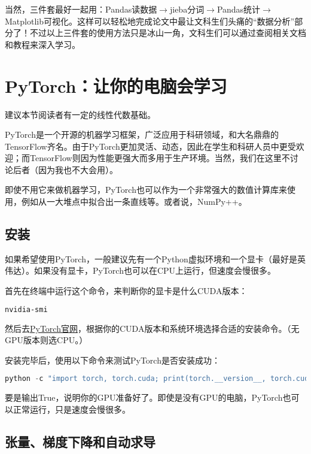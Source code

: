 \documentclass[../main.tex]{subfiles}
\begin{document}
当然，三件套最好一起用：Pandas读数据$\rightarrow$jieba分词$ \rightarrow $Pandas统计$
\rightarrow
$Matplotlib可视化。这样可以轻松地完成论文中最让文科生们头痛的“数据分析”部分了！不过以上三件套的使用方法只是冰山一角，文科生们可以通过查阅相关文档和教程来深入学习。

\section{PyTorch：让你的电脑会学习}
\begin{flushright}
  { \kaishu 建议本节阅读者有一定的线性代数基础。}
\end{flushright}

PyTorch是一个开源的机器学习框架，广泛应用于科研领域，和大名鼎鼎的TensorFlow齐名。由于PyTorch更加灵活、动态，因此在学生和科研人员中更受欢迎；而TensorFlow则因为性能更强大而多用于生产环境。当然，我们在这里不讨论后者（因为我也不大会用）。

即使不用它来做机器学习，PyTorch也可以作为一个非常强大的数值计算库来使用，例如从一大堆点中拟合出一条直线等。或者说，NumPy++。

\subsection{安装}

如果希望使用PyTorch，一般建议先有一个Python虚拟环境和一个显卡（最好是英伟达）。如果没有显卡，PyTorch也可以在CPU上运行，但速度会慢很多。

首先在终端中运行这个命令，来判断你的显卡是什么CUDA版本：
\begin{lstlisting}[language=bash]
nvidia-smi
\end{lstlisting}

然后去\href{https://pytorch.org/get-started/locally/}{PyTorch官网}，根据你的CUDA版本和系统环境选择合适的安装命令。（无GPU版本则选CPU。）

安装完毕后，使用以下命令来测试PyTorch是否安装成功：
\begin{lstlisting}[language=python]
python -c "import torch, torch.cuda; print(torch.__version__, torch.cuda.is_available())"
\end{lstlisting}
要是输出True，说明你的GPU准备好了。即使是没有GPU的电脑，PyTorch也可以正常运行，只是速度会慢很多。

\subsection{张量、梯度下降和自动求导}
\end{document}
